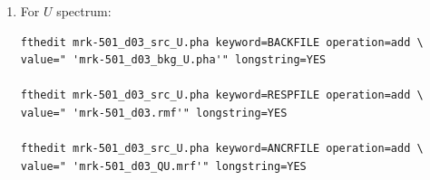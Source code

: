 \begin{itemize}
\begin{enumerate}
\begin{verbatim}
fthedit mrk-501_d03_src_Q.pha keyword=RESPFILE operation=add \
value=" 'mrk-501_d03.rmf'" longstring=YES

fthedit mrk-501_d03_src_Q.pha keyword=ANCRFILE operation=add \
value=" 'mrk-501_d03_QU.mrf'" longstring=YES
        	\end{verbatim}
        	
        	\item For $U$ spectrum:
        	\begin{verbatim}
fthedit mrk-501_d03_src_U.pha keyword=BACKFILE operation=add \
value=" 'mrk-501_d03_bkg_U.pha'" longstring=YES

fthedit mrk-501_d03_src_U.pha keyword=RESPFILE operation=add \
value=" 'mrk-501_d03.rmf'" longstring=YES

fthedit mrk-501_d03_src_U.pha keyword=ANCRFILE operation=add \
value=" 'mrk-501_d03_QU.mrf'" longstring=YES
        	\end{verbatim}
        \end{enumerate}
    \end{itemize}